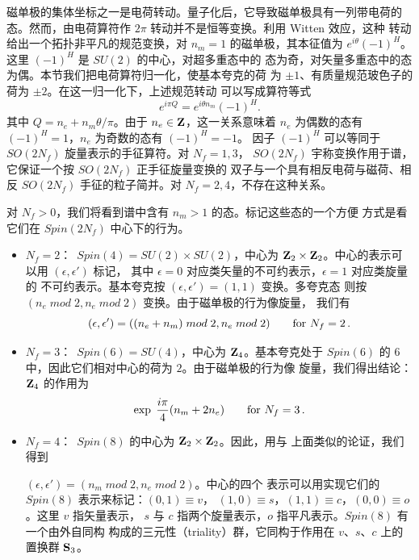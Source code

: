 磁单极的集体坐标之一是电荷转动。量子化后，它导致磁单极具有一列带电荷的
态。然而，由电荷算符作 $2\pi$ 转动并不是恒等变换。利用 Witten 效应，这种
转动给出一个拓扑非平凡的规范变换，对 $n_m = 1$ 的磁单极，其本征值为
$e^{i \theta} (-1)^H$。这里 $(-1)^H$ 是 $SU(2)$ 的中心，对超多重态中的
态为奇，对矢量多重态中的态为偶。本节我们把电荷算符归一化，使基本夸克的荷
为 $\pm 1$、有质量规范玻色子的荷为 $\pm 2$。在这一归一化下，上述规范转动
可以写成算符等式
$$
e^{i \pi Q} = e^{i \theta n_m} (-1)^H.
$$
其中 $Q = n_e + n_m \theta/\pi$。由于 $n_e \in {\bf Z}$，这一关系意味着
$n_e$ 为偶数的态有 $(-1)^H = 1$，$n_e$ 为奇数的态有 $(-1)^H = -1$。
因子 $(-1)^H$ 可以等同于 $SO(2N_f)$ 旋量表示的手征算符。对 $N_f = 1,3$，
$SO(2N_f)$ 宇称变换作用于谱，它保证一个按 $SO(2N_f)$ 正手征旋量变换的
双子与一个具有相反电荷与磁荷、相反 $SO(2N_f)$ 手征的粒子简并。对
$N_f = 2,4$，不存在这种关系。


对 $N_f > 0$，我们将看到谱中含有 $n_m > 1$ 的态。标记这些态的一个方便
方式是看它们在 $Spin(2N_f)$ 中心下的行为。
\begin{itemize}
\item

$N_f = 2$：\, $Spin(4) = SU(2) \times SU(2)$，中心为 ${\bf Z}_2
\times {\bf Z}_2$。中心的表示可以用 $(\epsilon , \epsilon ')$ 标记，
其中 $\epsilon = 0$ 对应类矢量的不可约表示，$\epsilon = 1$ 对应类旋量的
不可约表示。基本夸克按 $(\epsilon , \epsilon ') = (1,1)$ 变换。多夸克态
则按 $(n_e \; mod \; 2, n_e \; mod \; 2)$ 变换。由于磁单极的行为像旋量，
我们有
$$
(\epsilon , \epsilon ') = ((n_e + n_m) \; mod \; 2, n_e \; mod \; 2)
\qquad {\rm for}\,\, {N_f = 2}\,.
$$
\item
$N_f = 3$：\, $Spin(6) = SU(4)$，中心为 ${\bf Z}_{4}$。基本夸克处于
$Spin (6)$ 的 $6$ 中，因此它们相对中心的荷为 $2$。由于磁单极的行为像
旋量，我们得出结论：${\bf Z}_{4}$ 的作用为
$$
\exp \; \frac{i \pi}{4} (n_m + 2n_e)
\qquad{\rm for} \,\,{N_f = 3}\,.
$$
\item
$N_f=4$：\, $Spin(8)$ 的中心为 ${\bf Z}_2\times {\bf Z}_2$。因此，用与
上面类似的论证，我们得到

$(\epsilon,\epsilon')$$=$$(n_m\; mod\; 2, n_e\; mod \; 2) $。中心的四个
表示可以用实现它们的 $Spin(8)$ 表示来标记：$(0,1)\equiv v$，
$(1,0)\equiv s$，$(1,1)\equiv c$，$(0,0)\equiv o$。这里 $v$ 指矢量表示，
$s$ 与 $c$ 指两个旋量表示，$o$ 指平凡表示。$Spin(8)$ 有一个由外自同构
构成的三元性（triality）群，它同构于作用在 $v$、$s$、$c$ 上的置换群
${\bf S}_3$。
\end{itemize}

